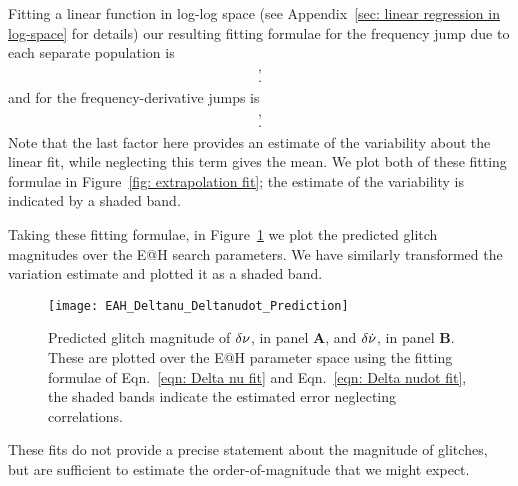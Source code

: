 \documentclass[../full_thesis/full_thesis.tex]{subfiles}
\newcommand{\thisdir}{../glitches_in_CGW}
\begin{document}
Fitting a linear function in log-log space (see Appendix~\ref{sec: linear regression in log-space} for details) our resulting fitting formulae for
the frequency jump due to each separate population is
\begin{align}
\begin{split}
,\\
.
\end{split}
\label{eqn: Delta nu fit}
\end{align}
and for the frequency-derivative jumps is
\begin{align}
\begin{split}
,\\
.
\end{split}
\label{eqn: Delta nudot fit}
\end{align}
Note that the last factor here provides
an estimate of the variability about the linear fit, while neglecting this term
gives the mean.
We plot both of these fitting formulae in Figure~\ref{fig: extrapolation fit};
the estimate of the variability is indicated by a shaded band.

Taking these fitting formulae, in Figure~\ref{fig: EAH Delta nu nudot prediction} we plot
the predicted glitch magnitudes over the E@H search parameters. We have similarly
transformed the variation estimate and plotted it as a shaded band.
\begin{figure}[htb]
\centering
\texttt{[image: EAH\_Deltanu\_Deltanudot\_Prediction]}
\caption{Predicted glitch magnitude of $\delta\nu$, in panel \textbf{A}, and
$\delta\dot{\nu}$, in panel \textbf{B}. These are plotted over the E@H parameter
space using the fitting formulae of Eqn.~\eqref{eqn: Delta nu fit} and
Eqn.~\eqref{eqn: Delta nudot fit}, the shaded bands indicate the estimated error
neglecting correlations.}
\label{fig: EAH Delta nu nudot prediction}
\end{figure}
These fits do not provide a precise statement about the magnitude of glitches,
but are sufficient to estimate the order-of-magnitude that we might expect.
\end{document}
